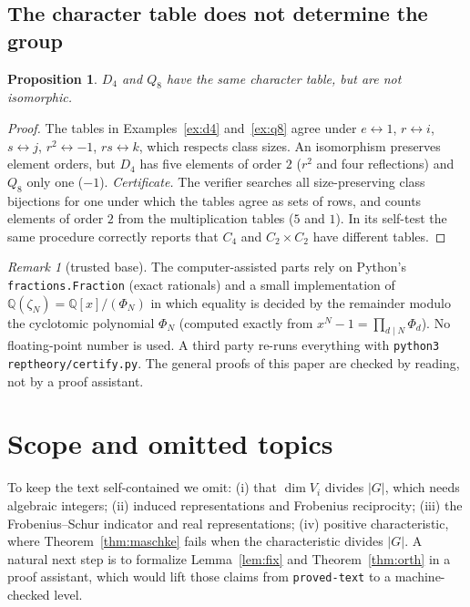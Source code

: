 \documentclass[11pt]{article}
\newtheorem{proposition}[theorem]{Proposition}
\theoremstyle{definition}
\theoremstyle{remark}
\newtheorem{remark}{Remark}
\newcommand{\claim}[1]{\leavevmode\marginpar{\raggedright\scriptsize\texttt{#1}}}
\newcommand{\Q}{\mathbb{Q}}
\begin{document}
\subsection{The character table does not determine the group}
\begin{proposition}\label{prop:dq}\claim{E-DQ}
$D_4$ and $Q_8$ have the same character table, but are not isomorphic.
\end{proposition}
\begin{proof}
The tables in Examples~\ref{ex:d4} and~\ref{ex:q8} agree under $e\leftrightarrow1$, $r\leftrightarrow i$, $s\leftrightarrow j$,
$r^2\leftrightarrow-1$, $rs\leftrightarrow k$, which respects class sizes. An isomorphism preserves element orders, but $D_4$ has five
elements of order $2$ ($r^2$ and four reflections) and $Q_8$ only one ($-1$).
\emph{Certificate.} The verifier searches all size-preserving class bijections for one under which the tables agree as
sets of rows, and counts elements of order $2$ from the multiplication tables ($5$ and $1$). In its self-test the same
procedure correctly reports that $C_4$ and $C_2\times C_2$ have different tables.
\end{proof}

\begin{remark}[trusted base]
The computer-assisted parts rely on Python's \texttt{fractions.Fraction} (exact rationals) and a small implementation of
$\Q(\zeta_N)=\Q[x]/(\Phi_N)$ in which equality is decided by the remainder modulo the cyclotomic polynomial $\Phi_N$
(computed exactly from $x^N-1=\prod_{d\mid N}\Phi_d$). No floating-point number is used. A third party re-runs everything
with \texttt{python3 reptheory/certify.py}. The general proofs of this paper are checked by reading, not by a proof
assistant.
\end{remark}

\section{Scope and omitted topics}
To keep the text self-contained we omit: (i) that $\dim V_i$ divides $|G|$, which needs algebraic integers;
(ii) induced representations and Frobenius reciprocity; (iii) the Frobenius--Schur indicator and real representations;
(iv) positive characteristic, where Theorem~\ref{thm:maschke} fails when the characteristic divides $|G|$. A natural next step
is to formalize Lemma~\ref{lem:fix} and Theorem~\ref{thm:orth} in a proof assistant, which would lift those claims from
\texttt{proved-text} to a machine-checked level.
\end{document}
